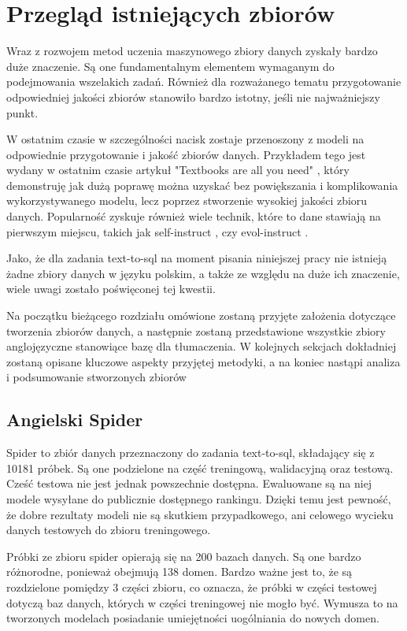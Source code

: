 \chapter{Przegląd istniejących zbiorów}
Wraz z rozwojem metod uczenia maszynowego zbiory danych zyskały bardzo duże znaczenie. Są one fundamentalnym elementem wymaganym do podejmowania wszelakich zadań. Również dla rozważanego tematu przygotowanie odpowiedniej jakości zbiorów stanowiło bardzo istotny, jeśli nie najważniejszy punkt.

W ostatnim czasie w szczególności nacisk zostaje przenoszony z modeli na odpowiednie przygotowanie i jakość zbiorów danych. Przykładem tego jest wydany w ostatnim czasie artykuł "Textbooks are all you need" \cite{Gunasekar2023}, który demonstruję jak dużą poprawę można uzyskać bez powiększania i komplikowania wykorzystywanego modelu, lecz poprzez stworzenie wysokiej jakości zbioru danych.
Popularność zyskuje również wiele technik, które to dane stawiają na pierwszym miejscu, takich jak self-instruct \cite{Wang2022}, czy evol-instruct \cite{Xu2023}.

Jako, że dla zadania text-to-sql na moment pisania niniejszej pracy nie istnieją żadne zbiory danych w języku polskim, a także ze względu na duże ich znaczenie, wiele uwagi zostało poświęconej tej kwestii. 

Na początku bieżącego rozdziału omówione zostaną przyjęte założenia dotyczące tworzenia zbiorów danych, a następnie zostaną przedstawione wszystkie zbiory anglojęzyczne stanowiące bazę dla tłumaczenia. W kolejnych sekcjach dokładniej zostaną opisane kluczowe aspekty przyjętej metodyki, a na koniec nastąpi analiza i podsumowanie stworzonych zbiorów

\section{Angielski Spider}
Spider to zbiór danych przeznaczony do zadania text-to-sql, składający się z 10181 próbek. Są one podzielone na część treningową, walidacyjną oraz testową. Cześć testowa nie jest jednak powszechnie dostępna. Ewaluowane są na niej modele wysyłane do publicznie dostępnego rankingu. Dzięki temu jest pewność, że dobre rezultaty modeli nie są skutkiem przypadkowego, ani celowego wycieku danych testowych do zbioru treningowego.

Próbki ze zbioru spider opierają się na 200 bazach danych. Są one bardzo różnorodne, ponieważ obejmują 138 domen. Bardzo ważne jest to, że są rozdzielone pomiędzy 3 części zbioru, co oznacza, że próbki w części testowej dotyczą baz danych, których w części treningowej nie mogło być. Wymusza to na tworzonych modelach posiadanie umiejętności uogólniania do nowych domen.

